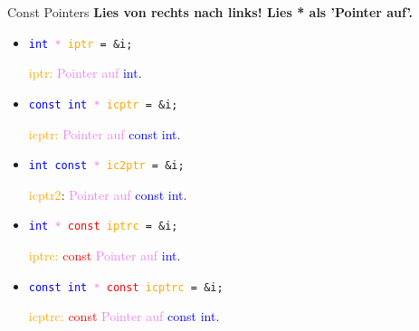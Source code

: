\ifnum\conditionmacro=1 \documentclass[handout,usenames,dvipsnames]{beamer}\fi
\begin{document}
\begin{frame}[fragile]{Const Pointers}
\textbf{Lies von rechts nach links! Lies * als  'Pointer auf'.}

\vspace{3ex}

\begin{minipage}[t]{0.4\linewidth}
\begin{itemize}
\item \texttt{\textcolor{blue}{int} \textcolor{violet}{*} \textcolor{orange}{iptr} = \&i;}

\textcolor{orange}{iptr:} \textcolor{violet}{Pointer auf} \textcolor{blue}{int}.
\item \texttt{\textcolor{blue}{const int}\textcolor{violet}{ *} \textcolor{orange}{icptr} = \&i;}

\textcolor{orange}{icptr:} \textcolor{violet}{Pointer auf} \textcolor{blue}{const int}.
\item \texttt{\textcolor{blue}{int const} \textcolor{violet}{*} \textcolor{orange}{ic2ptr} = \&i;}

\textcolor{orange}{icptr2}: \textcolor{violet}{Pointer auf} \textcolor{blue}{const int}.
\end{itemize}
\end{minipage}
\hfill
\begin{minipage}[t]{0.5\linewidth}
\begin{itemize}
\item \texttt{\textcolor{blue}{int} \textcolor{violet}{*} \textcolor{red}{const} \textcolor{orange}{iptrc} = \&i;}

\textcolor{orange}{iptrc:} \textcolor{red}{const} \textcolor{violet}{Pointer auf} \textcolor{blue}{int}.
\item \texttt{\textcolor{blue}{const int} \textcolor{violet}{*} \textcolor{red}{const} \textcolor{orange}{icptrc} = \&i;}

\textcolor{orange}{icptrc:} \textcolor{red}{const} \textcolor{violet}{Pointer auf} \textcolor{blue}{const int}.
\end{itemize}
\end{minipage}
\end{frame}
\end{document}
